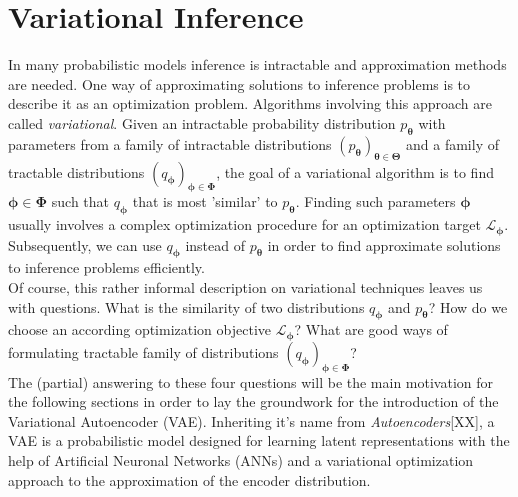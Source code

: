 \documentclass[12pt]{report}
\theoremstyle{definition}
\begin{document}
\section{Variational Inference}
In many probabilistic models inference is intractable and approximation methods are needed. One way of approximating solutions to inference problems is to describe it as an optimization problem. Algorithms involving this approach are called \emph{variational}.
Given an intractable probability distribution $p_{\pmb{\theta}}$ with parameters from a family of intractable distributions $(p_{\pmb{\theta}})_{\pmb{\theta} \in \pmb{\Theta}}$ and a family of tractable distributions $(q_{\pmb{\phi}})_{\pmb{\phi} \in \pmb{\Phi}}$, the goal of a variational algorithm is to find $\pmb{\phi} \in \pmb{\Phi}$ such that $q_{\pmb{\phi}}$ that is most 'similar' to $p_{\pmb{\theta}}$. Finding such parameters $\pmb{\phi}$ usually involves a complex optimization procedure for an optimization target $\mathcal{L}_{\pmb{\phi}}$. Subsequently, we can use $q_{\pmb{\phi}}$ instead of $p_{\pmb{\theta}}$ in order to find approximate solutions to inference problems efficiently.\\
Of course, this rather informal description on variational techniques leaves us with questions. What is the similarity of two distributions $q_{\pmb{\phi}}$ and $p_{\pmb{\theta}}$? How do we choose an according optimization objective $\mathcal{L}_{\pmb{\phi}}$? What are good ways of formulating tractable family of distributions $(q_{\pmb{\phi}})_{\pmb{\phi} \in \pmb{\Phi}}$? \\
The (partial) answering to these four questions will be the main motivation for the following sections in order to lay the groundwork for the introduction of the Variational Autoencoder (VAE). Inheriting it's name from \emph{Autoencoders}[XX], a VAE is a probabilistic model designed for learning latent representations with the help of Artificial Neuronal Networks (ANNs) and a variational optimization approach to the approximation of the encoder distribution.
\end{document}
